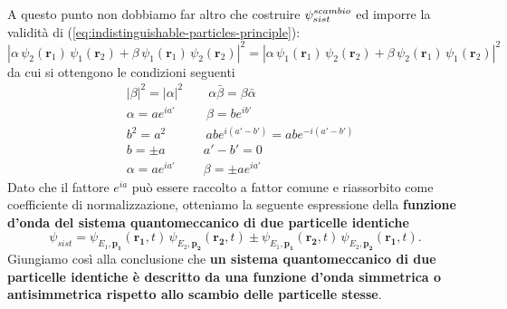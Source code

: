 A questo punto non dobbiamo far altro che costruire $ \mathlarger{\psi}^{scambio}_{sist}$
ed imporre la validità di (\ref{eq:indistinguishable-particles-principle}):
\[
    |\alpha\, \psi_2(\bm{r}_1)\,\psi_1(\bm{r}_2) + \beta\, \psi_1(\bm{r}_1)\,\psi_2(\bm{r}_2)|^2 =
    |\alpha\, \psi_1(\bm{r}_1)\,\psi_2(\bm{r}_2) + \beta\, \psi_2(\bm{r}_1)\,\psi_1(\bm{r}_2)|^2
\]
da cui si ottengono le condizioni seguenti
\begin{align*}
    &|\beta|^{2} = |\alpha|^{2} \qquad \alpha \bar{\beta} = \beta \bar{\alpha}  \\
    &\alpha = ae^{ ia' } \quad \ \  \quad  \beta = b e^{ ib' }  \\
    &b^{2} = a^{2} \qquad \quad \, ab e^{ i(a'-b') } = abe^{ -i(a'-b') } \\
    &b = \pm a \qquad \quad a'-b'=0 \\
    &\alpha = a e^{ ia' } \qquad \ \beta = \pm ae^{ ia' }
\end{align*}
Dato che il fattore $ e^{ia}$ può essere raccolto a fattor comune e riassorbito come
coefficiente di normalizzazione, otteniamo la seguente espressione della \textbf{funzione d’onda del sistema quantomeccanico
di due particelle identiche}
\begin{equation}
    \psi_{sist} = \psi_{E_1, \bm{p_1}} (\bm{r_1}, t) \, \psi_{E_2, \bm{p_2}} (\bm{r_2}, t) \pm \psi_{E_1, \bm{p_1}} (\bm{r_2}, t) \, \psi_{E_2, \bm{p_2}} (\bm{r_1}, t).
    \label{eq:identical-particles-wave-function}
\end{equation}
Giungiamo così alla conclusione che \textbf{un sistema quantomeccanico di due particelle identiche è descritto da una funzione
d’onda simmetrica o antisimmetrica rispetto allo scambio delle particelle stesse}.

